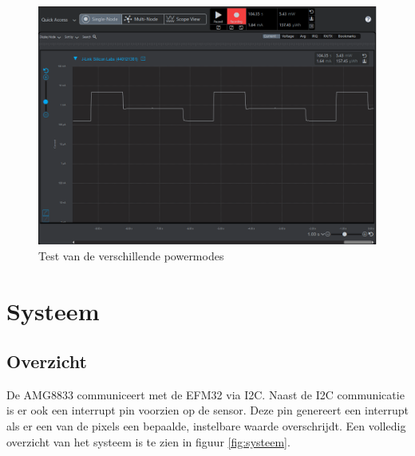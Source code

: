 \documentclass[]{article}
\begin{document}

\begin{figure}[!ht]
	\centering
	\includegraphics[width=\columnwidth]{power_modes_cycle_AMG8833_em2.png}
	\caption{Test van de verschillende powermodes}
	\label{fig:powertest}
\end{figure}

\section{Systeem}
\subsection{Overzicht}
De AMG8833 communiceert met de EFM32 via I2C. Naast de I2C communicatie is er ook een interrupt pin voorzien op de sensor. Deze pin genereert een interrupt als er een van de pixels een bepaalde, instelbare waarde overschrijdt. Een volledig overzicht van het systeem is te zien in figuur \ref{fig:systeem}.
\end{document}
